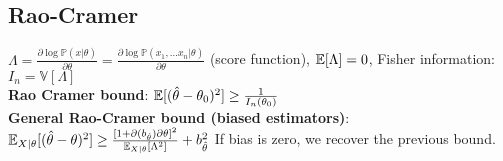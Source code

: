 \subsection*{Rao-Cramer}
$\Lambda = \frac{\partial \log \mathbb{P}(x|\theta )}{\partial \theta}=\frac{\partial \log \mathbb{P}(x_1,...x_n|\theta )}{\partial \theta}$ (score function), $\mathbb E[\Lambda ]=0$,
Fisher information: $I_n= \mathbb{V}[\Lambda]$ \\
\textbf{Rao Cramer bound}: $\mathbb E[(\hat{\theta}-\theta_0)^2]\geq \frac{1}{I_n(\theta_0)}$\\
\textbf{General Rao-Cramer bound (biased estimators)}:
$\mathbb E_{X|\theta}[(\hat \theta -\theta )^{2}] \geq \frac{[ 1+ \partial (b_{\hat \theta})\partial \theta]^{2}}{\mathbb E_{X|\theta}[\Lambda ^{2}]} + b_{\hat \theta}^{2}$ If bias is zero, we recover the previous bound.







